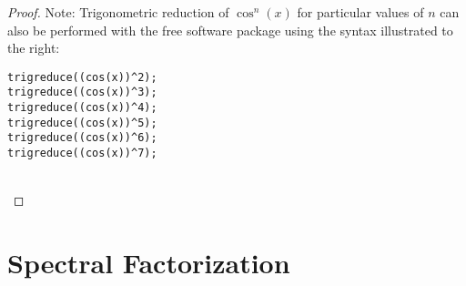\begin{proof}
\begin{minipage}{\tw-67mm}%
  Note: Trigonometric reduction of $\cos^n(x)$ for particular values of $n$ 
  can also be performed with the free software package 
      \href{http://maxima.sourceforge.net/}{\texttrademark} using the syntax illustrated to the right:\footnotemark
\end{minipage}%
\hspace{10mm}%
\begin{minipage}{48mm}
\begin{lstlisting}  
trigreduce((cos(x))^2);
trigreduce((cos(x))^3);
trigreduce((cos(x))^4);
trigreduce((cos(x))^5);
trigreduce((cos(x))^6);
trigreduce((cos(x))^7);
\end{lstlisting}
\end{minipage}%
\mbox{}\\
\end{proof}



\section{Spectral Factorization}


